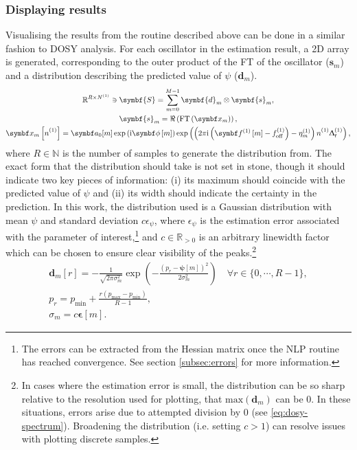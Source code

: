 \subsubsection{Displaying results}
Visualising the results from the routine described above can be done in a
similar fashion to \ac{DOSY} analysis. For each oscillator in the estimation
result, a \ac{2D} array is generated, corresponding to the outer product of the
\ac{FT} of the oscillator ($\symbf{s}_m$) and a distribution describing the
predicted value of $\psi$ ($\symbf{d}_m$).
\begin{subequations}
    \begin{gather}
        \mathbb{R}^{R \times \None} \ni \symbf{S} = \sum_{m=0}^{M-1}
        \symbf{d}_m \otimes
        \symbf{s}_m ,\label{eq:dosy-spectrum}\\
        \symbf{s}_m = \Re\left(\FT\left(\bx_m\right)\right),\\
        \bx_m\left[\none\right] = \bda_0[m] \exp\left(\iu \bdphim\right)
        \exp\left(\left(2 \pi \iu \left(\bdfonem - \foffone\right) - \etaonem \right) \none \Dtone\right),
    \end{gather}
    \label{eq:dosy-cross-product}
\end{subequations}
where $R \in \mathbb{N}$ is the number of samples to generate the distribution from.
The exact form that the distribution should take is not set in stone, though it
should indicate two key pieces of information:
(i) its maximum should coincide with the predicted value of $\psi$ and (ii) its
width should indicate the certainty in the prediction. In this work, the
distribution used is a Gaussian distribution with mean $\psi$ and standard
deviation $c \epsilon_{\psi}$, where $\epsilon_{\psi}$ is the
estimation error associated with the parameter of interest,\footnote{
    The errors can be extracted from the Hessian matrix once the \ac{NLP}
    routine has reached convergence. See section \ref{subsec:errors} for more
    information.
}
and $c \in \mathbb{R}_{>0}$ is an arbitrary linewidth factor which can be chosen
to ensure clear visibility of the peaks.\footnote{
    In cases where the estimation error is small, the distribution can be
    so sharp relative to the resolution used for plotting, that
    $\text{max}(\symbf{d}_m)$ can be $0$. In these situations, errors arise due
    to attempted division by $0$ (see \eqref{eq:dosy-spectrum}). Broadening the
    distribution (i.e. setting $c > 1$) can resolve issues with plotting
    discrete samples.
}
\begin{subequations}
    \begin{gather}
        \symbf{d}_m\left[ r \right] = -\frac{1}{\sqrt{2 \pi \sigma_m^2}}
        \exp\left(
            - \frac{\left(p_r - \symbf{\psi}[m]\right)^2}{2 \sigma_m^2}
        \right)\quad \forall r \in \lbrace 0, \cdots, R-1 \rbrace,\\
        p_r = p_{\text{min}} + \frac{r (p_{\text{max}} - p_{\text{min}})}{R-1},\\
        \sigma_m = c \symbf{\epsilon}[m].
    \end{gather}
    \label{eq:distribution}
\end{subequations}
